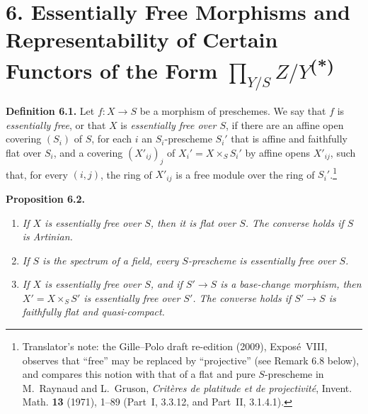 
\section*{6. Essentially Free Morphisms and Representability of Certain Functors of the Form \(\prod_{Y/S}Z/Y\)\textsuperscript{(*)}}

\begingroup
\renewcommand{\thefootnote}{(*)}
\endgroup

\noindent{}\textbf{Definition 6.1.}
Let \(f:X\to S\) be a morphism of preschemes. We say that \(f\) is
\emph{essentially free}, or that \(X\) is \emph{essentially free over
\(S\)}, if there are an affine open covering \((S_i)\) of \(S\), for
each \(i\) an \(S_i\)-prescheme \(S_i'\) that is affine and faithfully
flat over \(S_i\), and a covering \((X'_{ij})_j\) of
\(X_i'=X\times_SS_i'\) by affine opens \(X'_{ij}\), such that, for every
\((i,j)\), the ring of \(X'_{ij}\) is a free module over the ring of
\(S_i'\).\footnote{Translator's note: the Gille--Polo draft re-edition (2009), Expos\'e~VIII,
observes that ``free'' may be replaced by ``projective'' (see Remark 6.8 below), and compares this
notion with that of a flat and pure \(S\)-prescheme in M.~Raynaud and L.~Gruson, \emph{Crit\`eres de
platitude et de projectivit\'e}, Invent. Math. \textbf{13} (1971), 1--89 (Part~I, 3.3.12, and
Part~II, 3.1.4.1).}

\medskip
\noindent{}\textbf{Proposition 6.2.}
\begin{enumerate}
  \item[(a)]
  \textit{If \(X\) is essentially free over \(S\), then it is flat over
  \(S\). The converse holds if \(S\) is Artinian.}

  \item[(b)]
  \textit{If \(S\) is the spectrum of a field, every \(S\)-prescheme is
  essentially free over \(S\).}

  \item[(c)]
  \textit{If \(X\) is essentially free over \(S\), and if \(S'\to S\)
  is a base-change morphism, then \(X'=X\times_SS'\) is essentially
  free over \(S'\). The converse holds if \(S'\to S\) is faithfully
  flat and quasi-compact.}
\end{enumerate}

